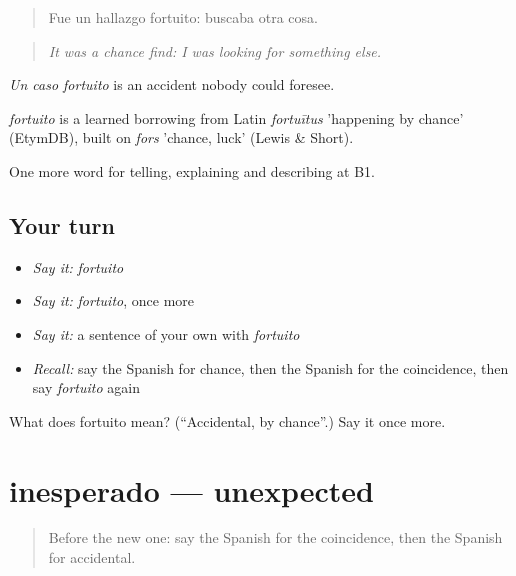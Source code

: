 \begin{quote}
Fue un hallazgo fortuito: buscaba otra cosa.
\end{quote}

\begin{quote}
\emph{It was a chance find: I was looking for something else.}
\end{quote}

\emph{Un caso fortuito} is an accident nobody could foresee.

\begin{cousinweb}
\emph{fortuito} is a learned borrowing from Latin \emph{fortuītus} 'happening by chance' (EtymDB), built on \emph{fors} 'chance, luck' (Lewis \& Short).
\end{cousinweb}

\begin{grammarlens}[title={What you've built}]
One more word for telling, explaining and describing at B1.
\end{grammarlens}

\subsection*{Your turn}
\begin{itemize}
\raggedright
  \item \emph{Say it:} \emph{fortuito}
  \item \emph{Say it:} \emph{fortuito}, once more
  \item \emph{Say it:} a sentence of your own with \emph{fortuito}
  \item \emph{Recall:} say the Spanish for chance, then the Spanish for the coincidence, then say \emph{fortuito} again
\end{itemize}

\begin{tcolorbox}[breakable,colback=teal!4,colframe=teal!35!black,title={Before you move on}]
What does fortuito mean? (\textquotedblleft{}Accidental, by chance\textquotedblright{}.) Say it once more.
\end{tcolorbox}
\section[inesperado]{inesperado — unexpected}

\label{lesson:ES-C533-inesperado}



\begin{quote}
Before the new one: say the Spanish for the coincidence, then the Spanish for accidental.
\end{quote}

